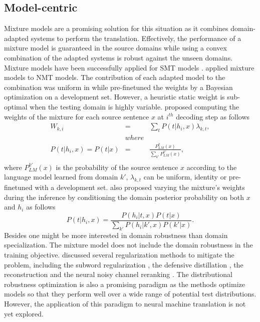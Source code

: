 \subsection{Model-centric}
Mixture models are a promising solution for this situation as it combines domain-adapted systems to perform the translation. Effectively, the performance of a mixture model is guaranteed in the source domains while using a convex combination of the adapted systems is robust against the unseen domains. Mixture models have been successfully applied for SMT models \citep{Sennrich12perplexity, Carpuat14linear, Sennrich12mixture}. \citet{Sajjad17neural, Saunders19domain,Freitag16fast} applied mixture models to NMT models. The contribution of each adapted model to the combination was uniform in \citet{Freitag16fast} while \citet{Sajjad17neural} pre-finetuned the weights by a Bayesian optimization on a development set. However, a heuristic static weight is sub-optimal when the testing domain is highly variable. \citet{Saunders19domain} proposed computing the weights of the mixture for each source sentence $x$ at $i^{th}$ decoding step as follows
\begin{equation}
\begin{array}{rcl}
W_{k,i} &=& \displaystyle{\mathop{\sum}_{t} P(t|h_i,x)\lambda_{k,t}}, \\
&where& \\
P(t|h_i,x) = P(t|x) &=& \frac{\displaystyle{P^k_{LM}(x)}}{\displaystyle{\mathop{\sum}_{k'} P^{k'}_{LM}(x)}},\\
\end{array}
\end{equation}
where $P^{k'}_{LM}(x)$ is the probability of the source sentence $x$ according to the language model learned from domain $k'$, $\lambda_{k,t}$ can be uniform, identity or pre-finetuned with a development set. \citet{Saunders19domain} also proposed varying the mixture's weights during the inference by conditioning the domain posterior probability on both $x$ and $h_i$ as follows
\begin{equation}
P(t|h_i,x) = \frac{P(h_i|t,x) P(t|x)}{\displaystyle{\mathop{\sum}_{k'} P(h_i|k',x) P(k'|x)}}.
\end{equation} 
Besides one might be more interested in domain robustness than domain specialization. The mixture model does not include the domain robustness in the training objective. \citet{Muller20domain} discussed several regularization methods to mitigate the problem, including the subword regularization \citep{Taku18subword}, the defensive distillation \citep{Papernot16distillation}, the reconstruction \citep{Tu17neural} and the neural noisy channel reranking \citep{Li16mutual}. The distributional robustness optimization \citep{Oren19distributionally,BenTal13robust} is also a promising paradigm as the methods optimize models so that they perform well over a wide range of potential test distributions. However, the application of this paradigm to neural machine translation is not yet explored.
